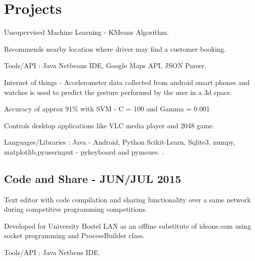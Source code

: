 \documentclass[]{deedy-resume-openfont}
\begin{document}
\begin{minipage}[t]{0.66\textwidth} 


\section{Projects}

\vspace{\topsep} %
\begin{tightemize}
\item Unsupervised Machine Learning - KMeans Algorithm.
\item Recommends nearby location where driver may find a customer booking.
\item Tools/API : Java Netbeans IDE, Google Maps API, JSON Parser.
\end{tightemize}
\sectionsep

\begin{tightemize}
\item Internet of things - Accelerometer data collected from android smart phones and watches is used to predict the gesture performed by the user in a 3d space.
\item Accuracy of approx 91\% with SVM - C = 100 and Gamma = 0.001
\item Controls desktop applications like VLC media player and 2048 game.
\item Languages/Libraries : Java - Android, Python Scikit-Learn, Sqlite3, numpy, matplotlib,pyuserinput - pykeyboard and pymouse.
.\end{tightemize}
\sectionsep

\subsection{Code and Share - JUN/JUL 2015}
\begin{tightemize}
\item Text editor with code compilation and sharing functionality over a same network during competitive programming competitions.
\item Developed for University Hostel LAN as an offline substitute of ideone.com using socket programming and ProcessBuilder class.
\item Tools/API : Java Netbens IDE.
\end{tightemize}
\sectionsep


\end{minipage}
\end{document}
